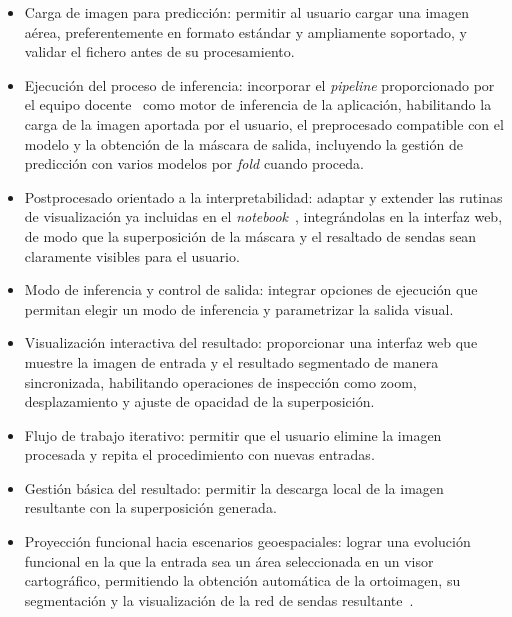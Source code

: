 \begin{itemize}
	\item Carga de imagen para predicción: permitir al usuario cargar una imagen aérea, preferentemente en formato estándar y ampliamente soportado, y validar el fichero antes de su procesamiento.
	
	\item Ejecución del proceso de inferencia: incorporar el \textit{pipeline} proporcionado por el equipo docente~\cite{diezpastora2025trails} como motor de inferencia de la aplicación, habilitando la carga de la imagen aportada por el usuario, el preprocesado compatible con el modelo y la obtención de la máscara de salida, incluyendo la gestión de predicción con varios modelos por \textit{fold} cuando proceda.
	
	\item Postprocesado orientado a la interpretabilidad: adaptar y extender las rutinas de visualización ya incluidas en el \textit{notebook}~\cite{diezpastora2025trails}, integrándolas en la interfaz web, de modo que la superposición de la máscara y el resaltado de sendas sean claramente visibles para el usuario.
		
	\item Modo de inferencia y control de salida: integrar opciones de ejecución que permitan elegir un modo de inferencia y parametrizar la salida visual.
	
	\item Visualización interactiva del resultado: proporcionar una interfaz web que muestre la imagen de entrada y el resultado segmentado de manera sincronizada, habilitando operaciones de inspección como zoom, desplazamiento y ajuste de opacidad de la superposición.
	
	\item Flujo de trabajo iterativo: permitir que el usuario elimine la imagen procesada y repita el procedimiento con nuevas entradas.
	
	\item Gestión básica del resultado: permitir la descarga local de la imagen resultante con la superposición generada.
	
	\item Proyección funcional hacia escenarios geoespaciales: lograr una evolución funcional en la que la entrada sea un área seleccionada en un visor cartográfico, permitiendo la obtención automática de la ortoimagen, su segmentación y la visualización de la red de sendas resultante~\cite{pnoa_ign}.
\end{itemize}

